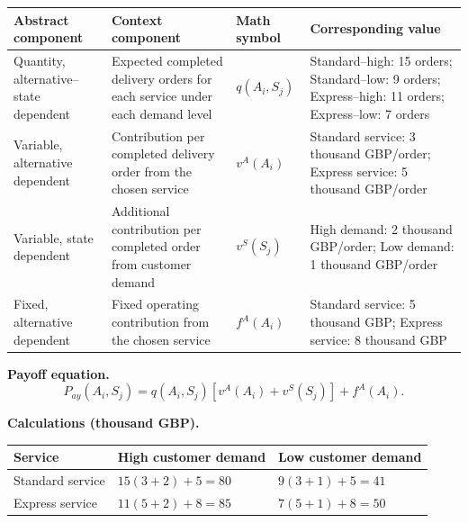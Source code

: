 {		\begin{center}
			\small
			\begin{tabularx}{\textwidth}{
					>{\raggedright\arraybackslash}X
					>{\raggedright\arraybackslash}X
					>{\centering\arraybackslash}p{}
					>{\raggedright\arraybackslash}X
				}
				\toprule
				Abstract component & Context component & Math symbol & Corresponding value \\
				\midrule
				Quantity, alternative--state dependent
				&
				Expected completed delivery orders for each service under each demand level
				&
				$q(A_i,S_j)$
				&
				Standard--high: 15 orders; Standard--low: 9 orders; Express--high: 11 orders; Express--low: 7 orders
				\\
				
				Variable, alternative dependent
				&
				Contribution per completed delivery order from the chosen service
				&
				$v^A(A_i)$
				&
				Standard service: 3 thousand GBP/order; Express service: 5 thousand GBP/order
				\\
				
				Variable, state dependent
				&
				Additional contribution per completed order from customer demand
				&
				$v^S(S_j)$
				&
				High demand: 2 thousand GBP/order; Low demand: 1 thousand GBP/order
				\\
				
				Fixed, alternative dependent
				&
				Fixed operating contribution from the chosen service
				&
				$f^A(A_i)$
				&
				Standard service: 5 thousand GBP; Express service: 8 thousand GBP
				\\
				\bottomrule
			\end{tabularx}
		\end{center}
		
		\textbf{Payoff equation.}
		\[
		P_{ay}(A_i,S_j)
		=
		q(A_i,S_j)
		\left[
		v^A(A_i)+v^S(S_j)
		\right]
		+
		f^A(A_i).
		\]
		
		\textbf{Calculations (thousand GBP).}
		
		\begin{center}
			\begin{tabularx}{\textwidth}{
					>{\raggedright\arraybackslash}X
					>{\centering\arraybackslash}X
					>{\centering\arraybackslash}X
				}
				\toprule
				Service & High customer demand & Low customer demand \\
				\midrule
				Standard service & $15(3+2)+5=80$ & $9(3+1)+5=41$ \\
				Express service & $11(5+2)+8=85$ & $7(5+1)+8=50$ \\
				\bottomrule
			\end{tabularx}
		\end{center}
		
}
